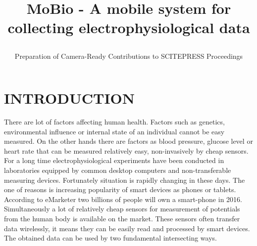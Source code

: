 \documentclass[a4paper,twoside]{article}
\begin{document}
\title{MoBio - A mobile system for collecting electrophysiological data\subtitle{Preparation of Camera-Ready Contributions to SCITEPRESS Proceedings} }

\author{
}   



\onecolumn \maketitle \normalsize \vfill

\section{\uppercase{Introduction}}
\label{sec:introduction}

\noindent 
There are lot of factors affecting human health. Factors such as genetics, environmental influence or internal state of an individual cannot be easy measured. On the other hands there are factors as blood pressure, glucose level or heart rate that can be measured relatively easy, non-invasively by cheap sensors. For a long time electrophysiological experiments have been conducted in laboratories equipped by common desktop computers and non-transferable measuring devices. Fortunately situation is rapidly changing in these days. The one of reasons is increasing popularity of smart devices as phones or tablets. According to eMarketer \cite{emark} two billions of people will own a smart-phone in 2016. Simultaneously a lot of relatively cheap sensors for measurement of potentials from the human body is available on the market. These sensors often transfer data wirelessly, it means they can be easily read and processed by smart devices. The obtained data can be used by two fundamental intersecting ways. 
\end{document}
